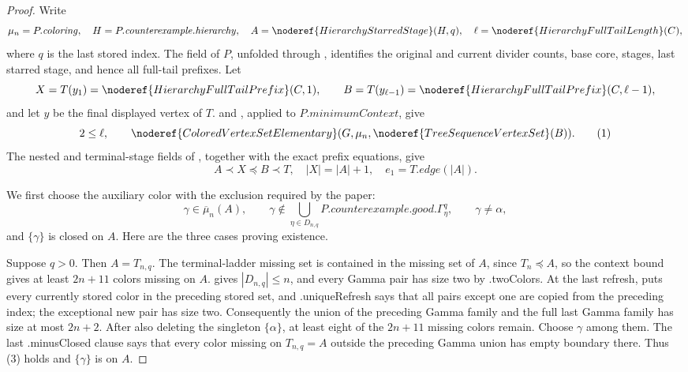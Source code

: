 \begin{proof}
Write
\[
 \mu_n=P.\mathit{coloring},\quad
 H=P.\mathit{counterexample}.\mathit{hierarchy},\quad
 A=\noderef{HierarchyStarredStage}(H,q),\quad
 \ell=\noderef{HierarchyFullTailLength}(C),
\]
where \(q\) is the last stored index.  The
 field of \(P\), unfolded through
, identifies the original and current
divider counts, base core, stages, last starred stage, and hence all
full-tail prefixes.  Let
\[
 X=T(y_1)=\noderef{HierarchyFullTailPrefix}(C,1),\qquad
 B=T(y_{\ell-1})=\noderef{HierarchyFullTailPrefix}(C,\ell-1),
\]
and let \(y\) be the final displayed vertex of \(T\).
 and
, applied to
\(P.\mathit{minimumContext}\), give
\[
 2\le\ell,\qquad
 \noderef{ColoredVertexSetElementary}
       (G,\mu_n,\noderef{TreeSequenceVertexSet}(B)).          \tag{1}
\]
The nested and terminal-stage fields of
, together with the exact prefix equations,
give
\[
 A\prec X\preccurlyeq B\prec T,\quad |X|=|A|+1,\quad
 e_1=T.\mathit{edge}(|A|).                                  \tag{2}
\]

We first choose the auxiliary color with the exclusion required by the
paper:
\[
 \gamma\in\overline\mu_n(A),\qquad
 \gamma\notin\bigcup_{\eta\in D_{n,q}}
       P.\mathit{counterexample}.\mathit{good}.\Gamma^q_\eta,
 \qquad \gamma\ne\alpha,                                    \tag{3}
\]
and \(\{\gamma\}\) is closed on \(A\).  Here are the three cases proving
existence.

Suppose \(q>0\).  Then \(A=T_{n,q}\).  The terminal-ladder missing set is
contained in the missing set of \(A\), since \(T_n\preccurlyeq A\), so
the context bound gives at least \(2n+11\) colors missing on \(A\).
 gives
\(|D_{n,q}|\le n\), and every Gamma pair has size two by
.twoColors.  At the last refresh,
 puts every currently stored color
in the preceding stored set, and
.uniqueRefresh says that all pairs except one are
copied from the preceding index; the exceptional new pair has size two.
Consequently the union of the preceding Gamma family and the full last
Gamma family has size at most \(2n+2\).  After also deleting the singleton
\(\{\alpha\}\), at least eight of the \(2n+11\) missing colors remain.
Choose \(\gamma\) among them.  The last
.minusClosed clause says that every color missing
on \(T_{n,q}=A\) outside the preceding Gamma union has empty boundary
there.  Thus (3) holds and \(\{\gamma\}\) is
 on \(A\).


\end{proof}
